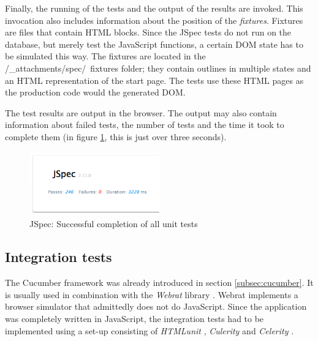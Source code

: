 Finally, the running of the tests and the output of the results are invoked. This invocation also includes information about the position of the \textit{fixtures}. Fixtures are files that contain HTML blocks. Since the JSpec tests do not run on the database, but merely test the JavaScript functions, a certain DOM state has to be simulated this way. The fixtures are located in the {\selectfont /\_attachments/spec/\ fixtures} folder; they contain outlines in multiple states and an HTML representation of the start page. The tests use these HTML pages as the production code would the generated DOM.

The test results are output in the browser. The output may also contain information about failed tests, the number of tests and the time it took to complete them (in figure \ref{fig:jspec-good}, this is just over three seconds).

\medskip
\begin{figure}[ht] 
  \begin{center}
    \includegraphics[width=0.5\textwidth]{grafik/jspec-example-good} 
  \end{center}
  \caption{JSpec: Successful completion of all unit tests}
  \label{fig:jspec-good} 
\end{figure}





\subsection{Integration tests}
\label{subsec:integrationtests}

The Cucumber framework was already introduced in section \ref{subsec:cucumber}. It is usually used in combination with the \textit{Webrat} library \cite{webrat:website}. Webrat implements a browser simulator that admittedly does not do JavaScript. Since the application was completely written in JavaScript, the integration tests had to be implemented using a set-up consisting of \textit{HTMLunit} \cite{htmlunit:website}, \textit{Culerity} \cite{culerity:website} and \textit{Celerity} \cite{celerity:website}.

